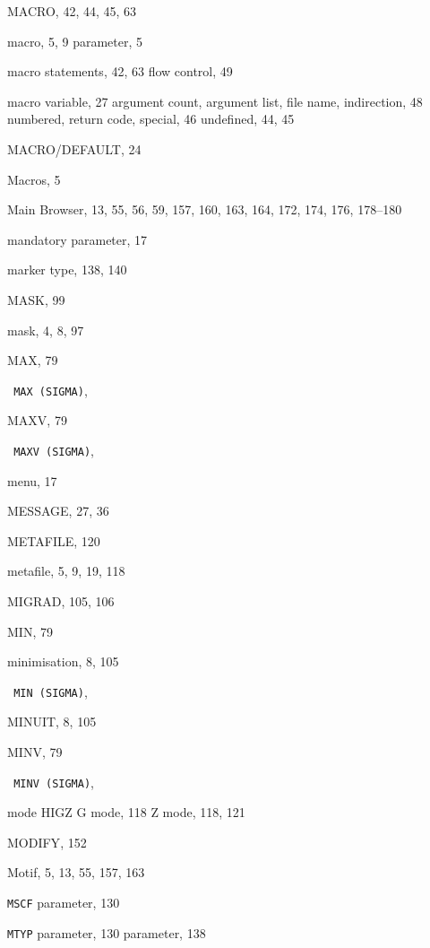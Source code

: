 \begin{theindex}
  \item {\ttfamily  MACRO}, 42, 44, 45, 63
  \item macro, 5, 9
    \subitem parameter, 5
  \item macro statements, 42, 63
    \subitem flow control, 49
  \item macro variable, 27
    \subitem argument count, 
    \subitem argument list, 
    \subitem file name, 
    \subitem indirection, 48
    \subitem numbered, 
    \subitem return code, 
    \subitem special, 46
    \subitem undefined, 44, 45
  \item {\ttfamily  MACRO/DEFAULT}, 24
  \item Macros, 5
  \item Main Browser, 13, 55, 56, 59, 157, 160, 163, 164, 172, 174, 176, 
		178--180
  \item mandatory parameter, 17
  \item marker
    \subitem type, 138, 140
  \item {\ttfamily  MASK}, 99
  \item mask, 4, 8, 97
  \item {\ttfamily  MAX}, 79
  \item \texttt  { MAX{ \textrm {(SIGMA)}}}, 
  \item {\ttfamily  MAXV}, 79
  \item \texttt  { MAXV{ \textrm {(SIGMA)}}}, 
  \item menu, 17
  \item {\ttfamily  MESSAGE}, 27, 36
  \item {\ttfamily  METAFILE}, 120
  \item metafile, 5, 9, 19, 118
  \item {\ttfamily  MIGRAD}, 105, 106
  \item {\ttfamily  MIN}, 79
  \item minimisation, 8, 105
  \item \texttt  { MIN{ \textrm {(SIGMA)}}}, 
  \item MINUIT, 8, 105
  \item {\ttfamily  MINV}, 79
  \item \texttt  { MINV{ \textrm {(SIGMA)}}}, 
  \item mode 
    \subitem HIGZ
      \subsubitem G mode, 118
      \subsubitem Z mode, 118, 121
  \item {\ttfamily  MODIFY}, 152
  \item Motif, 5, 13, 55, 157, 163
  \item {\tt MSCF}
     parameter, 130
  \item {\tt MTYP}
     parameter, 130
     parameter, 138


\end{theindex}
